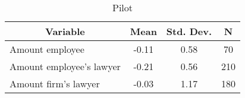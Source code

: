 
\begin{table}[htbp]\centering \caption{Pilot \label{sumstat}}
\begin{tabular}{l c c  c}\hline\hline
\multicolumn{1}{c}{\textbf{Variable}} & \textbf{Mean}
 & \textbf{Std. Dev.} & \textbf{N}\\ \hline
Amount employee & -0.11 & 0.58  & 70\\
Amount employee's lawyer & -0.21 & 0.56  & 210\\
Amount firm's lawyer & -0.03 & 1.17  & 180\\
\hline\end{tabular}
\end{table}
